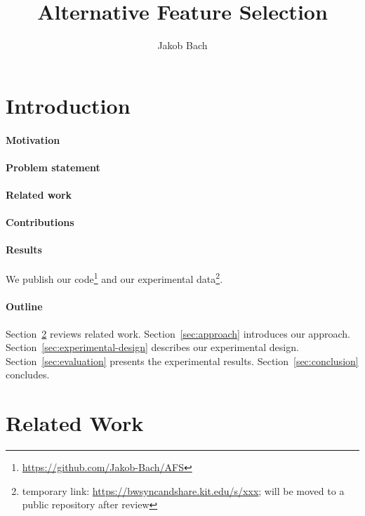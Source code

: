 \documentclass{article}
\title{Alternative Feature Selection}
\author{Jakob Bach}
\begin{document}
\maketitle

\begin{abstract}
\end{abstract}

\section{Introduction}
\label{sec:introduction}

\paragraph{Motivation}

\paragraph{Problem statement}

\paragraph{Related work}

\paragraph{Contributions}

\paragraph{Results}

We publish our code\footnote{\url{https://github.com/Jakob-Bach/AFS}} and our experimental data\footnote{temporary link: \url{https://bwsyncandshare.kit.edu/s/xxx}; will be moved to a public repository after review}.

\paragraph{Outline}

Section~\ref{sec:related-work} reviews related work.
Section~\ref{sec:approach} introduces our approach.
Section~\ref{sec:experimental-design} describes our experimental design.
Section~\ref{sec:evaluation} presents the experimental results.
Section~\ref{sec:conclusion} concludes.

\section{Related Work}
\label{sec:related-work}
\end{document}
